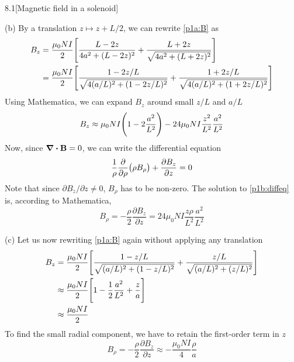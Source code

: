 \documentclass[12pt]{article}
\begin{document}
\begin{problem}{8.1}[Magnetic field in a solenoid]
\begin{solution}
(b) By a translation $z\mapsto z+L /2$, we can rewrite \eqref{p1a:B} as
\begin{align}
    B_z
    &=\frac{\mu_0NI}{2}\qty[\frac{L-2z}{4a^2+(L-2z)^2}+\frac{L+2z}{\sqrt{4a^2+(L+2z)^2}}]\notag\\
    &=\frac{\mu_0NI}{2}\qty[\frac{1-2z/L}{\sqrt{4(a/L)^2+(1-2z/L)^2}}+\frac{1+2z/L}{\sqrt{4(a/L)^2+(1+2z/L)^2}}]
\end{align}
Using Mathematica, we can expand $B_z$ around small $z /L$ and $a /L$
\begin{equation}
    B_z\approx\mu_0NI\qty(1-2\frac{a^2}{L^2})-24\mu_0NI\frac{z^2}{L^2}\frac{a^2}{L^2} 
\end{equation}
Now, since $\div{\vb{B}}=0$, we can write the differential equation
\begin{equation}\label{p1b:diffeq}
    \frac1\rho\frac{\partial}{\partial\rho}\qty(\rho B_\rho)+\frac{\partial
    B_z}{\partial z}=0 
\end{equation}
Note that since $\partial B_z /\partial z\neq 0$, $B_\rho$ has to be non-zero.
The solution to \eqref{p1b:diffeq} is, according to Mathematica,
\begin{equation}
    B_\rho=-\frac{\rho}{2}\frac{\partial B_z}{\partial
    z}=24\mu_0NI\frac{z\rho}{L^2}\frac{a^2}{L^2} 
\end{equation}

(c) Let us now rewriting \eqref{p1a:B} again without applying any translation
\begin{align}
    B_z
    &=\frac{\mu_0NI}{2}\qty[\frac{1-z/L}{\sqrt{(a/L)^2+(1-z/L)^2}}+\frac{z/L}{\sqrt{(a/L)^2+(z/L)^2}}]
    \notag\\
    &\approx\frac{\mu_0NI}{2}\qty[1-\frac12\frac{a^2}{L^2}+\frac{z}{a}]\notag\\
    &\approx\frac{\mu_0NI}{2}
\end{align}
To find the small radial component, we have to retain the first-order term in
$z$
\begin{equation}
    B_\rho=-\frac{\rho}{2}\frac{\partial B_z}{\partial
    z}\approx-\frac{\mu_0NI}{4}\frac{\rho}{a} 
\end{equation}
\end{solution}
\end{problem}
\end{document}
